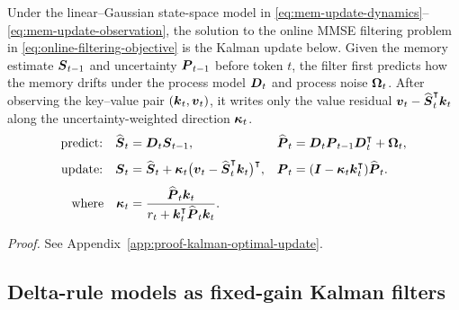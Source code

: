 \documentclass[11pt,letterpaper,logo]{yalearxiv}
\begin{document}
\label{prop:kalman-associative-memory}
\begin{tcolorbox}[
  title={Proposition~\thedefinition: Kalman Associative Memory},
  colback=blue!7,
  colbacktitle=blue!22,
  colframe=blue!45!black,
  coltitle=black,
  fonttitle=\bfseries,
  boxrule=0.4pt,
  arc=1pt,
  left=5pt,
  right=5pt,
  top=5pt,
  bottom=5pt
]
Under the linear--Gaussian state-space model in
\eqref{eq:mem-update-dynamics}--\eqref{eq:mem-update-observation}, the solution to the online
MMSE filtering problem in \eqref{eq:online-filtering-objective} is the Kalman update below.
Given the memory estimate $\boldsymbol{S}_{t-1}$ and uncertainty
$\boldsymbol{P}_{t-1}$ before token $t$, the filter first predicts how the memory drifts under the process
model
$\boldsymbol{D}_t$ and process noise $\boldsymbol{\Omega}_t$. After observing the key--value pair
$(\boldsymbol{k}_t,\boldsymbol{v}_t)$, it writes only the value residual
$\boldsymbol{v}_t-\widehat{\boldsymbol{S}}_t^{\intercal}\boldsymbol{k}_t$ along the uncertainty-weighted
direction $\boldsymbol{\kappa}_t$.
\begin{equation}
\begin{aligned}
  \text{predict:}\quad
  \widehat{\boldsymbol{S}}_t &= \boldsymbol{D}_t \boldsymbol{S}_{t-1},
  &
  \widehat{\boldsymbol{P}}_t &= \boldsymbol{D}_t \boldsymbol{P}_{t-1}\boldsymbol{D}_t^{\intercal}+\boldsymbol{\Omega}_t,
  \\[3pt]
  \text{update:}\quad
  \boldsymbol{S}_t &= \widehat{\boldsymbol{S}}_t+\boldsymbol{\kappa}_t
  \big(\boldsymbol{v}_t-\widehat{\boldsymbol{S}}_t^{\intercal}\boldsymbol{k}_t\big)^{\intercal},
  &
  \boldsymbol{P}_t &= (\boldsymbol{I}-\boldsymbol{\kappa}_t \boldsymbol{k}_t^{\intercal})\widehat{\boldsymbol{P}}_t .
  \\[3pt]
  \text{where}\quad
  \boldsymbol{\kappa}_t &= \frac{\widehat{\boldsymbol{P}}_t \boldsymbol{k}_t}
  {r_t+\boldsymbol{k}_t^{\intercal}\widehat{\boldsymbol{P}}_t \boldsymbol{k}_t}.
\end{aligned}
\label{eq:kalman-optimal-update-box}
\end{equation}
\end{tcolorbox}

\noindent\textit{Proof.} See Appendix~\ref{app:proof-kalman-optimal-update}.

\subsection{Delta-rule models as fixed-gain Kalman filters}
\label{sec:delta-family-kalman}
\end{document}
